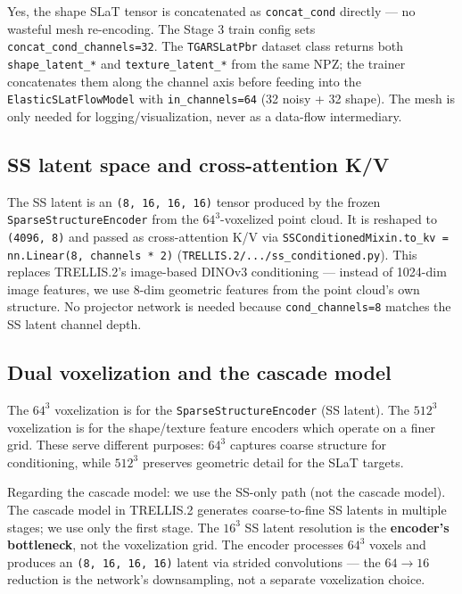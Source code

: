 Yes, the shape SLaT tensor is concatenated as \texttt{concat\_cond}
directly --- no wasteful mesh re-encoding. The Stage 3 train config sets
\texttt{concat\_cond\_channels=32}. The \texttt{TGARSLatPbr} dataset class
returns both \texttt{shape\_latent\_*} and \texttt{texture\_latent\_*} from
the same NPZ; the trainer concatenates them along the channel axis before
feeding into the \texttt{ElasticSLatFlowModel} with \texttt{in\_channels=64}
(32 noisy + 32 shape). The mesh is only needed for logging/visualization,
never as a data-flow intermediary.

\subsection{SS latent space and cross-attention K/V}

The SS latent is an \texttt{(8, 16, 16, 16)} tensor produced by the frozen
\texttt{SparseStructureEncoder} from the $64^3$-voxelized point cloud. It
is reshaped to \texttt{(4096, 8)} and passed as cross-attention K/V via
\texttt{SSConditionedMixin.to\_kv = nn.Linear(8, channels * 2)}
(\texttt{TRELLIS.2/.../ss\_conditioned.py}). This replaces TRELLIS.2's
image-based DINOv3 conditioning --- instead of 1024-dim image features, we
use 8-dim geometric features from the point cloud's own structure. No
projector network is needed because \texttt{cond\_channels=8} matches the
SS latent channel depth.

\subsection{Dual voxelization and the cascade model}

The $64^3$ voxelization is for the \texttt{SparseStructureEncoder} (SS
latent). The $512^3$ voxelization is for the shape/texture feature encoders
which operate on a finer grid. These serve different purposes: $64^3$
captures coarse structure for conditioning, while $512^3$ preserves
geometric detail for the SLaT targets.

Regarding the cascade model: we use the SS-only path (not the cascade
model). The cascade model in TRELLIS.2 generates coarse-to-fine SS latents
in multiple stages; we use only the first stage. The $16^3$ SS latent
resolution is the \textbf{encoder's bottleneck}, not the voxelization grid.
The encoder processes $64^3$ voxels and produces an \texttt{(8, 16, 16, 16)}
latent via strided convolutions --- the $64 \to 16$ reduction is the
network's downsampling, not a separate voxelization choice.

